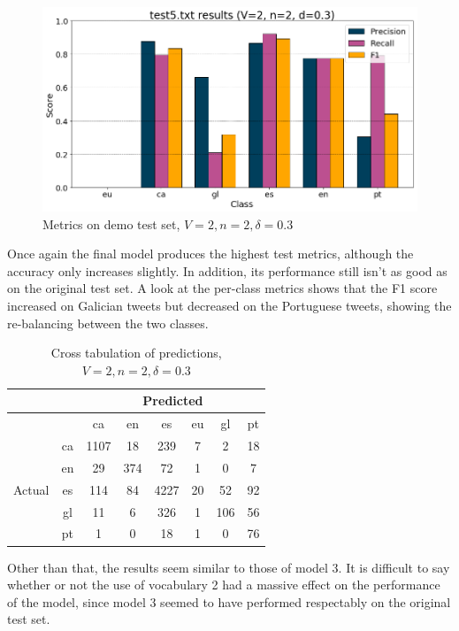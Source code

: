 \documentclass[runningheads]{llncs}
\begin{document}
\begin{figure}
    \begin{center}
        \includegraphics[width=12.5cm]{images/test5_results_2_2_0.3.png}
        \caption{Metrics on demo test set, $V=2, n=2, \delta=0.3$}
        \label{fig:demo_2_2_0.3}
    \end{center}
\end{figure}

Once again the final model produces the highest test metrics, although the accuracy only increases slightly. In addition, its performance still isn't as good as on the original test set. A look at the per-class metrics shows that the F1 score increased on Galician tweets but decreased on the Portuguese tweets, showing the re-balancing between the two classes. 

\begin{table}
	\centering
	\caption{Cross tabulation of predictions, $V=2, n=2, \delta=0.3$}
	\label{tab:demo_confusion_2_2_0.3}
	\begin{tabular}{|c|c|c|c|c|c|c|c|} \hline
	    & & \multicolumn{6}{c|}{Predicted} \\ \hline
		& &    ca &   en &    es &  eu &   gl &  pt \\ \hline
		\multirow{6}{*}{Actual} & ca   &  1107 &   18 &   239 &   7 &    2 &  18 \\
		& en   &    29 &  374 &    72 &   1 &    0 &   7 \\
		& es   &   114 &   84 &  4227 &  20 &   52 &  92 \\
		& gl   &    11 &    6 &   326 &   1 &  106 &  56 \\
		& pt   &     1 &    0 &    18 &   1 &    0 &  76 \\ \hline
	\end{tabular}
\end{table}

Other than that, the results seem similar to those of model 3. It is difficult to say whether or not the use of vocabulary 2 had a massive effect on the performance of the model, since model 3 seemed to have performed respectably on the original test set.
\end{document}
